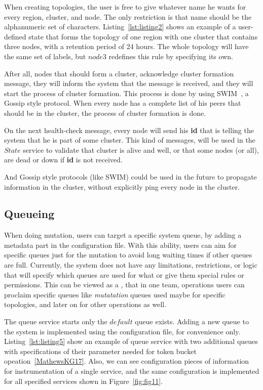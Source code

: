 When creating topologies, the user is free to give whatever name he wants for every region, cluster, and node. The only restriction is that name should be the alphanumeric set of characters. Listing~\ref{lst:listing2} shows an example of a user-defined state that forms the topology of one region with one cluster that contains three nodes, with a retention period of 24 hours. The whole topology will have the same set of labels, but $node3$ redefines this rule by specifying its own.



\noindent
After all, nodes that should form a cluster, acknowledge cluster formation message, they will inform the system that the message is received, and they will start the process of cluster formation. This process is done by using SWIM~\cite{DasGM02}, a Gossip style protocol. When every node has a complete list of his peers that should be in the cluster, the process of cluster formation is done. 

On the next health-check message, every node will send his \textbf{id} that is telling the system that he is part of some cluster. This kind of messages, will be used in the $State$ service to validate that cluster is alive and well, or that some nodes (or all), are dead or down if \textbf{id} is not received. 

And Gossip style protocols (like SWIM) could be used in the future to propagate information in the cluster, without explicitly ping every node in the cluster.
%
%
\subsection{Queueing}\label{sec:queueing}
%
When doing mutation, users can target a specific system queue, by adding a metadata part in the configuration file. With this ability, users can aim for specific queues just for the mutation to avoid long waiting times if other queues are full. Currently, the system does not have any limitations, restrictions, or logic that will specify which queues are used for what or give them special rules or permissions. This can be viewed as a , that in one team, operations users can proclaim specific queues like \textit{mutatation} queues used maybe for specific topologies, and later on for other operations as well.

The queue service starts only the $default$ queue exists. Adding a new queue to the system is implemented using the configuration file, for convenience only. Listing~\ref{lst:listing5} show an example of queue service with two additional queues with specifications of their parameter needed for token bucket opeation~\ref{MathewsKG17}. Also, we can see configuration pieces of information for instrumentation of a single service, and the same configuration is implemented for all specified services shown in Figure~\ref{fig:fig11}.

